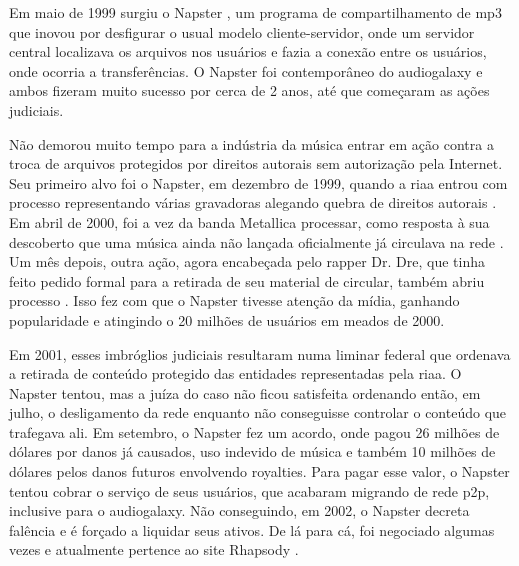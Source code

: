 Em maio de 1999 surgiu o Napster \cite{site:wiki-napster}, um programa de
compartilhamento de \gls*{mp3} que inovou por desfigurar o usual modelo
cliente-servidor, onde um servidor central localizava os arquivos nos usuários e fazia
a conexão entre os usuários, onde ocorria a transferências. O Napster foi contemporâneo
do \gls*{audiogalaxy} e ambos fizeram muito sucesso por cerca de 2 anos, até que
começaram as ações judiciais.

Não demorou muito tempo para a indústria da música entrar em ação contra a troca de
arquivos protegidos por direitos autorais sem autorização pela Internet. Seu primeiro
alvo foi o Napster, em dezembro de 1999, quando a \gls{riaa} entrou com processo
representando várias gravadoras alegando quebra de direitos autorais
\cite{site:napster-riaa}. Em abril de 2000, foi a vez da banda Metallica processar,
como resposta à sua descoberto que uma música ainda não lançada oficialmente já
circulava na rede \cite{site:napster-metallica,site:napster-metallica-orig}. Um mês
depois, outra ação, agora encabeçada pelo rapper Dr. Dre, que tinha feito pedido formal
para a retirada de seu material de circular, também abriu processo
\cite{site:napster-drdre-orig}. Isso fez com que o Napster tivesse atenção da mídia,
ganhando popularidade e atingindo o 20 milhões de usuários em meados de 2000.


Em 2001, esses imbróglios judiciais resultaram numa liminar federal que ordenava a
retirada de conteúdo protegido das entidades representadas pela \gls*{riaa}. O Napster
tentou, mas a juíza do caso não ficou satisfeita ordenando então, em julho, o
desligamento da rede enquanto não conseguisse controlar o conteúdo que trafegava ali. Em
setembro, o Napster fez um acordo, onde pagou 26 milhões de dólares por danos já
causados, uso indevido de música e também 10 milhões de dólares pelos danos futuros
envolvendo royalties. Para pagar esse valor, o Napster tentou cobrar o serviço de seus
usuários, que acabaram migrando de rede \gls*{p2p}, inclusive para o \gls*{audiogalaxy}.
Não conseguindo, em 2002, o Napster decreta falência e é forçado a liquidar seus ativos.
De lá para cá, foi negociado algumas vezes e atualmente pertence ao site Rhapsody
\cite{site:napster-rhapsody}.

